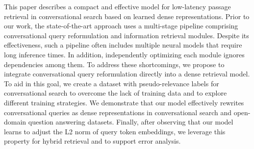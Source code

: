 This paper describes a compact and effective model for low-latency passage retrieval in conversational search based on learned dense representations. Prior to our work, the state-of-the-art approach uses a multi-stage pipeline comprising conversational query reformulation and information retrieval modules. Despite its effectiveness, such a pipeline often includes multiple neural models that require long inference times. In addition, independently optimizing each module ignores dependencies among them. To address these shortcomings, we propose to integrate conversational query reformulation directly into a dense retrieval model. To aid in this goal, we create a dataset with pseudo-relevance labels for conversational search to overcome the lack of training data and to explore different training strategies. We demonstrate that our model effectively rewrites conversational queries as dense representations in conversational search and open-domain question answering datasets. Finally, after observing that our model learns to adjust the L2 norm of query token embeddings, we leverage this property for hybrid retrieval and to support error analysis.
